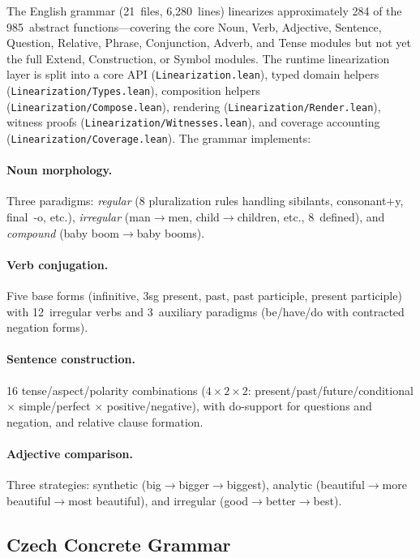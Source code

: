 \documentclass[11pt]{article}
\newcommand{\code}[1]{\texttt{#1}}
\begin{document}
The English grammar (21~files, 6,280~lines) linearizes approximately 284 of
the 985~abstract functions---covering the core Noun, Verb, Adjective,
Sentence, Question, Relative, Phrase, Conjunction, Adverb, and Tense
modules but not yet the full Extend, Construction, or Symbol modules.
The runtime linearization layer is split into a core API
(\code{Linearization.lean}), typed domain helpers
(\code{Linearization/Types.lean}), composition helpers
(\code{Linearization/Compose.lean}), rendering
(\code{Linearization/Render.lean}), witness proofs
(\code{Linearization/Witnesses.lean}), and coverage accounting
(\code{Linearization/Coverage.lean}).
The grammar implements:

\paragraph{Noun morphology.}  Three paradigms: \emph{regular} (8 pluralization
rules handling sibilants, consonant+y, final~-o, etc.), \emph{irregular}
(man$\to$men, child$\to$children, etc., 8~defined), and \emph{compound}
(baby boom$\to$baby booms).

\paragraph{Verb conjugation.}  Five base forms (infinitive, 3sg present,
past, past participle, present participle) with 12~irregular verbs and
3~auxiliary paradigms (be/have/do with contracted negation forms).

\paragraph{Sentence construction.}  16 tense/aspect/polarity combinations
($4 \times 2 \times 2$: present/past/future/conditional $\times$
simple/perfect $\times$ positive/negative), with do-support for questions
and negation, and relative clause formation.

\paragraph{Adjective comparison.}  Three strategies: synthetic
(big$\to$bigger$\to$biggest), analytic (beautiful$\to$more
beautiful$\to$most beautiful), and irregular (good$\to$better$\to$best).

\subsection{Czech Concrete Grammar}
\end{document}
